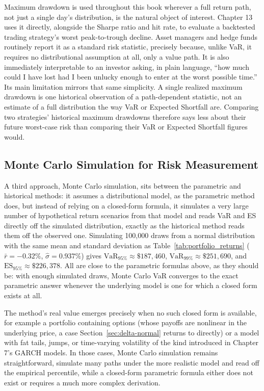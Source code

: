 \documentclass[../ai_in_finance]{subfiles}
\begin{document}
Maximum drawdown is used throughout this book wherever a full return path, not just a single day's distribution, is the natural object of interest. Chapter 13 uses it directly, alongside the Sharpe ratio and hit rate, to evaluate a backtested trading strategy's worst peak-to-trough decline. Asset managers and hedge funds routinely report it as a standard risk statistic, precisely because, unlike VaR, it requires no distributional assumption at all, only a value path. It is also immediately interpretable to an investor asking, in plain language, ``how much could I have lost had I been unlucky enough to enter at the worst possible time.''
Its main limitation mirrors that same simplicity. A single realized maximum drawdown is one historical observation of a path-dependent statistic, not an estimate of a full distribution the way VaR or Expected Shortfall are. Comparing two strategies' historical maximum drawdowns therefore says less about their future worst-case risk than comparing their VaR or Expected Shortfall figures would.

\subsection{Monte Carlo Simulation for Risk Measurement}

A third approach, Monte Carlo simulation, sits between the parametric and historical methods: it assumes a distributional model, as the parametric method does, but instead of relying on a closed-form formula, it simulates a very large number of hypothetical return scenarios from that model and reads VaR and ES directly off the simulated distribution, exactly as the historical method reads them off the observed one.
Simulating 100,000 draws from a normal distribution with the same mean and standard deviation as Table~\ref{tab:portfolio_returns} ($\bar r=-0.32\%$, $\hat\sigma=0.937\%$) gives $\text{VaR}_{95\%} \approx \$187{,}460$, $\text{VaR}_{99\%} \approx \$251{,}690$, and $\text{ES}_{95\%} \approx \$226{,}378$. All are close to the parametric formulas above, as they should be: with enough simulated draws, Monte Carlo VaR converges to the exact parametric answer whenever the underlying model is one for which a closed form exists at all.

The method's real value emerges precisely when no such closed form is available, for example a portfolio containing options (whose payoffs are nonlinear in the underlying price, a case Section~\ref{sec:delta-normal} returns to directly) or a model with fat tails, jumps, or time-varying volatility of the kind introduced in Chapter 7's GARCH models. In those cases, Monte Carlo simulation remains straightforward, simulate many paths under the more realistic model and read off the empirical percentile, while a closed-form parametric formula either does not exist or requires a much more complex derivation.
\end{document}
